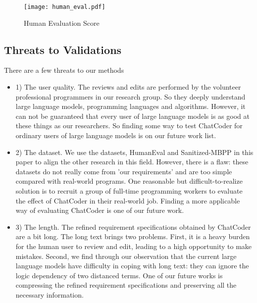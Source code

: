 \documentclass[sigconf]{acmart}
\begin{document}
\begin{figure}
    \centering
    \texttt{[image: human\_eval.pdf]}
    \caption{Human Evaluation Score}
    \label{fig:human_eval}
\end{figure}


\subsection{Threats to Validations}
There are a few threats to our methods
\begin{itemize}
    \item 1) The user quality. The reviews and edits are performed by the volunteer professional programmers in our research group. So they deeply understand large language models, programming languages and algorithms. However, it can not be guaranteed that every user of large language models is as good at these things as our researchers. So finding some way to test ChatCoder for ordinary users of large language models is on our future work list.
    \item 2) The dataset. We use the datasets, HumanEval and Sanitized-MBPP in this paper to align the other research in this field. However, there is a flaw: these datasets do not really come from 'our requirements' and are too simple compared with real-world programs. One reasonable but difficult-to-realize solution is to recruit a group of full-time programming workers to evaluate the effect of ChatCoder in their real-world job. Finding a more applicable way of evaluating ChatCoder is one of our future work.
    \item 3) The length. The refined requirement specifications obtained by ChatCoder are a bit long. The long text brings two problems. First, it is a heavy burden for the human user to review and edit, leading to a high opportunity to make mistakes. Second, we find through our observation that the current large language models have difficulty in coping with long text: they can ignore the logic dependency of two distanced terms. One of our future works is compressing the refined requirement specifications and preserving all the necessary information. 
    
\end{itemize}
\end{document}
